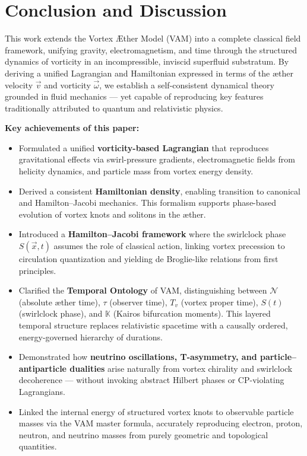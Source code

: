 \section{Conclusion and Discussion}

This work extends the Vortex \AE{}ther Model (VAM) into a complete classical field framework, unifying gravity, electromagnetism, and time through the structured dynamics of vorticity in an incompressible, inviscid superfluid substratum. By deriving a unified Lagrangian and Hamiltonian expressed in terms of the æther velocity $\vec{v}$ and vorticity $\vec{\omega}$, we establish a self-consistent dynamical theory grounded in fluid mechanics — yet capable of reproducing key features traditionally attributed to quantum and relativistic physics.

\vspace{0.5em}
\noindent
\textbf{Key achievements of this paper:}
\begin{itemize}
    \item Formulated a unified \textbf{vorticity-based Lagrangian} that reproduces gravitational effects via swirl-pressure gradients, electromagnetic fields from helicity dynamics, and particle mass from vortex energy density.

    \item Derived a consistent \textbf{Hamiltonian density}, enabling transition to canonical and Hamilton--Jacobi mechanics. This formalism supports phase-based evolution of vortex knots and solitons in the æther.

    \item Introduced a \textbf{Hamilton--Jacobi framework} where the swirlclock phase $S(\vec{x}, t)$ assumes the role of classical action, linking vortex precession to circulation quantization and yielding de Broglie-like relations from first principles.

    \item Clarified the \textbf{Temporal Ontology} of VAM, distinguishing between $\mathcal{N}$ (absolute æther time), $\tau$ (observer time), $T_v$ (vortex proper time), $S(t)$ (swirlclock phase), and $\mathbb{K}$ (Kairos bifurcation moments). This layered temporal structure replaces relativistic spacetime with a causally ordered, energy-governed hierarchy of durations.

    \item Demonstrated how \textbf{neutrino oscillations, T-asymmetry, and particle–antiparticle dualities} arise naturally from vortex chirality and swirlclock decoherence — without invoking abstract Hilbert phases or CP-violating Lagrangians.

    \item Linked the internal energy of structured vortex knots to observable particle masses via the VAM master formula, accurately reproducing electron, proton, neutron, and neutrino masses from purely geometric and topological quantities.
\end{itemize}

